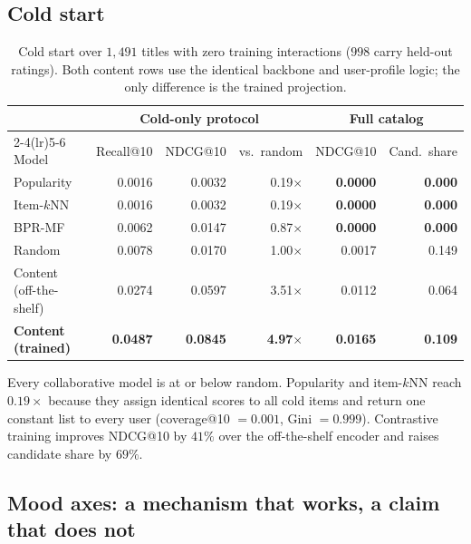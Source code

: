 \documentclass[11pt,a4paper]{article}
\begin{document}
\subsection{Cold start}

\begin{table}[h]
\centering
\caption{Cold start over $1{,}491$ titles with zero training interactions
($998$ carry held-out ratings). Both content rows use the identical backbone and
user-profile logic; the only difference is the trained projection.}
\begin{tabular}{lrrrrr}
\toprule
& \multicolumn{3}{c}{Cold-only protocol} & \multicolumn{2}{c}{Full catalog} \\
\cmidrule(lr){2-4}\cmidrule(lr){5-6}
Model & Recall@10 & NDCG@10 & vs.\ random & NDCG@10 & Cand.\ share \\
\midrule
Popularity        & 0.0016 & 0.0032 & 0.19$\times$ & \textbf{0.0000} & \textbf{0.000} \\
Item-$k$NN        & 0.0016 & 0.0032 & 0.19$\times$ & \textbf{0.0000} & \textbf{0.000} \\
BPR-MF            & 0.0062 & 0.0147 & 0.87$\times$ & \textbf{0.0000} & \textbf{0.000} \\
Random            & 0.0078 & 0.0170 & 1.00$\times$ & 0.0017 & 0.149 \\
Content (off-the-shelf) & 0.0274 & 0.0597 & 3.51$\times$ & 0.0112 & 0.064 \\
\textbf{Content (trained)} & \textbf{0.0487} & \textbf{0.0845} & \textbf{4.97}$\times$
  & \textbf{0.0165} & \textbf{0.109} \\
\bottomrule
\end{tabular}
\end{table}

Every collaborative model is at or below random. Popularity and item-$k$NN reach
$0.19\times$ because they assign identical scores to all cold items and return
one constant list to every user (coverage@10 $=0.001$, Gini $=0.999$).
Contrastive training improves NDCG@10 by $41\%$ over the off-the-shelf encoder
and raises candidate share by $69\%$.

\subsection{Mood axes: a mechanism that works, a claim that does not}
\end{document}
